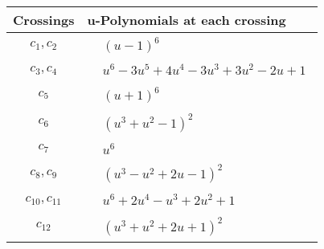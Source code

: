 \documentclass[1p]{elsarticle_modified}
\theoremstyle{definition}
\begin{document}
\begin{tabular}{m{50pt}|m{274pt}}
Crossings & \hspace{64pt}u-Polynomials at each crossing \\
\hline $$\begin{aligned}c_{1},c_{2}\end{aligned}$$&$\begin{aligned}
&(u-1)^6
\end{aligned}$\\
\hline $$\begin{aligned}c_{3},c_{4}\end{aligned}$$&$\begin{aligned}
&u^6-3 u^5+4 u^4-3 u^3+3 u^2-2 u+1
\end{aligned}$\\
\hline $$\begin{aligned}c_{5}\end{aligned}$$&$\begin{aligned}
&(u+1)^6
\end{aligned}$\\
\hline $$\begin{aligned}c_{6}\end{aligned}$$&$\begin{aligned}
&(u^3+u^2-1)^2
\end{aligned}$\\
\hline $$\begin{aligned}c_{7}\end{aligned}$$&$\begin{aligned}
&u^6
\end{aligned}$\\
\hline $$\begin{aligned}c_{8},c_{9}\end{aligned}$$&$\begin{aligned}
&(u^3- u^2+2 u-1)^2
\end{aligned}$\\
\hline $$\begin{aligned}c_{10},c_{11}\end{aligned}$$&$\begin{aligned}
&u^6+2 u^4- u^3+2 u^2+1
\end{aligned}$\\
\hline $$\begin{aligned}c_{12}\end{aligned}$$&$\begin{aligned}
&(u^3+u^2+2 u+1)^2
\end{aligned}$\\
\hline
\end{tabular}\\~\\
\end{document}
